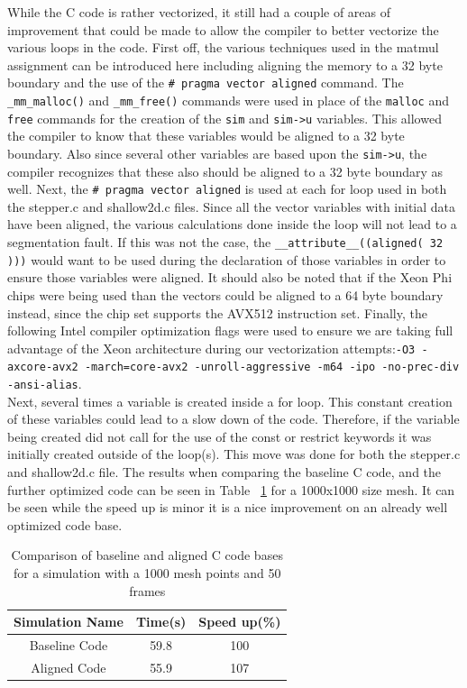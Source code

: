 \documentclass[12pt]{article}
\begin{document}
While the C code is rather vectorized, it still had a couple of areas of improvement that could be made to allow the compiler to better vectorize the various loops in the code. First off, the various techniques used in the matmul assignment can be introduced here including aligning the memory to a 32 byte boundary and the use of the \texttt{\# pragma vector aligned} command. The \texttt{\_mm\_malloc()} and \texttt{\_mm\_free()} commands were used in place of the \texttt{malloc} and \texttt{free} commands for the creation of the \texttt{sim} and \texttt{sim->u} variables. This allowed the compiler to know that these variables would be aligned to a 32 byte boundary. Also since several other variables are based upon the \texttt{sim->u}, the compiler recognizes that these also should be aligned to a 32 byte boundary as well. Next, the \texttt{\# pragma vector aligned} is used at each for loop used in both the stepper.c and shallow2d.c files. Since all the vector variables with initial data have been aligned, the various calculations done inside the loop will not lead to a segmentation fault. If this was not the case, the \texttt{\_\_attribute\_\_((aligned( 32 )))} would want to be used during the declaration of those variables in order to ensure those variables were aligned. It should also be noted that if the Xeon Phi chips were being used than the vectors could be aligned to a 64 byte boundary instead, since the chip set supports the AVX512 instruction set. Finally, the following Intel compiler optimization flags were used to ensure we are taking full advantage of the Xeon architecture during our vectorization attempts:\texttt{-O3 -axcore-avx2 -march=core-avx2 -unroll-aggressive -m64 -ipo -no-prec-div -ansi-alias}. \\

Next, several times a variable is created inside a for loop. This constant creation of these variables could lead to a slow down of the code. Therefore, if the variable being created did not call for the use of the const or restrict keywords it was initially created outside of the loop(s). This move was done for both the stepper.c and shallow2d.c file. The results when comparing the baseline C code, and the further optimized code can be seen in Table ~\ref{opttable} for a 1000x1000 size mesh. It can be seen while the speed up is minor it is a nice improvement on an already well optimized code base.

\begin{table}[h]
	\begin{center}
		\begin{tabular}{|c c c|}
			\hline
			Simulation Name & Time(s) & Speed up(\%) \\ \hline
			Baseline Code & 59.8 & 100   \\ \hline
			Aligned Code & 55.9 & 107 \\ \hline
		\end{tabular}
		\caption{Comparison of baseline and aligned C code bases for a simulation with a 1000 mesh points and 50 frames}
		\label{opttable}
	\end{center}
\end{table}
\end{document}
